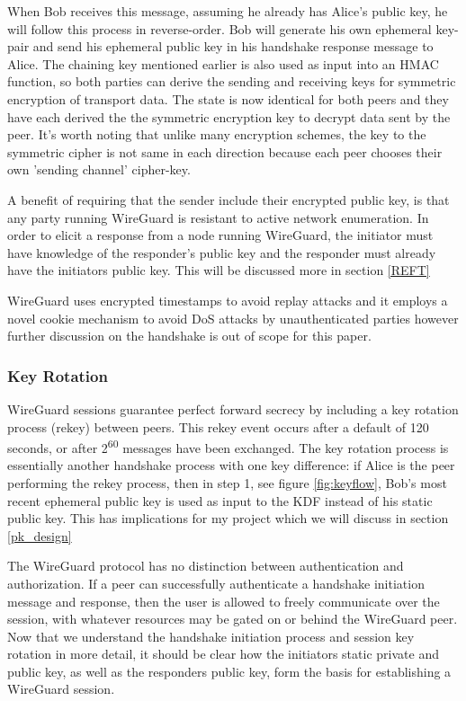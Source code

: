 \documentclass [11pt, proquest] {uwthesis}[2020/02/24]
\begin{document}
When Bob receives this message, assuming he already has Alice's public key, he will follow this process in reverse-order. Bob will generate his own ephemeral key-pair and send his ephemeral public key in his handshake response message to Alice. The chaining key mentioned earlier is also used as input into an HMAC function, so both parties can derive the sending and receiving keys for symmetric encryption of transport data.
The state is now identical for both peers and they have each derived the the symmetric encryption key to decrypt data sent by the peer. It's worth noting that unlike many encryption schemes, the key to the symmetric cipher is not same in each direction because each peer chooses their own 'sending channel' cipher-key.

A benefit of requiring that the sender include their encrypted public key, is that any party running WireGuard is resistant to active network enumeration. In order to elicit a response from a node running WireGuard, the initiator must have knowledge of the responder's public key and the responder must already have the initiators public key. This will be discussed more in section \ref{REFT}

WireGuard uses encrypted timestamps to avoid replay attacks and it employs a novel cookie mechanism to avoid DoS attacks by unauthenticated parties however further discussion on the handshake is out of scope for this paper.

\subsubsection{Key Rotation}
\label{keyrotate}
WireGuard sessions guarantee perfect forward secrecy by including a key rotation process (rekey) between peers. This rekey event occurs after a default of 120 seconds, or after 2\textsuperscript{60} messages have been exchanged. The key rotation process is essentially another handshake process with one key difference: if Alice is the peer performing the rekey process, then in step 1, see figure \ref{fig:keyflow}, Bob's most recent ephemeral public key is used as input to the KDF instead of his static public key. This has implications for my project which we will discuss in section \ref{pk_design}

The WireGuard protocol has no distinction between authentication and authorization. If a peer can successfully authenticate a handshake initiation message and response, then the user is allowed to freely communicate over the session, with whatever resources may be gated on or behind the WireGuard peer.
Now that we understand the handshake initiation process and session key rotation in more detail, it should be clear how the initiators static private and public key, as well as the responders public key, form the basis for establishing a WireGuard session.
\end{document}
